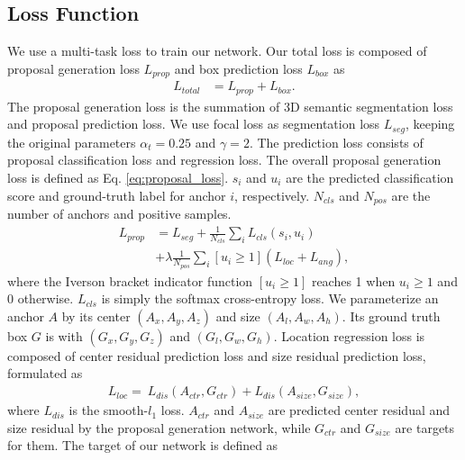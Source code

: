 \documentclass[10pt,twocolumn,letterpaper]{article}
\begin{document}
\subsection{Loss Function}
We use a multi-task loss to train our network. Our total loss is composed of proposal generation loss $L_{prop}$ and box prediction loss $L_{box}$ as 
\begin{equation} \label{eq:total_loss}
\begin{aligned}
L_{total} &= L_{prop} + L_{box}.
\end{aligned}
\end{equation}
The proposal generation loss is the summation of 3D semantic segmentation loss and proposal prediction loss. We use focal loss \cite{FocalLoss} as segmentation loss $L_{seg}$, keeping the original parameters $\alpha_t = 0.25$ and $\gamma = 2$. The prediction loss consists of proposal classification loss and regression loss. The overall proposal generation loss is defined as Eq. \eqref{eq:proposal_loss}. $s_i$ and $u_i$ are the predicted classification score and ground-truth label for anchor $i$, respectively. $N_{cls}$ and $N_{pos}$ are the number of anchors and positive samples.
\begin{equation} \label{eq:proposal_loss}
\begin{aligned}
L_{prop} &= L_{seg} + \frac{1}{N_{cls}} \sum_i L_{cls} (s_i, u_i) \\
&+ \lambda \frac{1}{N_{pos}} \sum_i  [u_i \geq 1] (L_{loc} + L_{ang}),
\end{aligned}
\end{equation}
where the Iverson bracket indicator function $[u_i \geq 1]$ reaches 1 when $u_i \geq 1$ and 0 otherwise. $L_{cls}$ is simply the softmax cross-entropy loss.
We parameterize an anchor $A$ by its center $(A_x, A_y, A_z)$ and size $(A_l, A_w, A_h)$. Its ground truth box $G$ is with $(G_x, G_y, G_z)$ and $(G_l, G_w, G_h)$.
Location regression loss is composed of center residual prediction loss and size residual prediction loss, formulated as
\begin{equation} \label{eq:regnoangle}
\begin{aligned}
L_{loc} =\ L_{dis}(A_{ctr}, G_{ctr}) + L_{dis}(A_{size}, G_{size}),
\end{aligned}
\end{equation}
where $L_{dis}$ is the smooth-$l_1$ loss. $A_{ctr}$ and $A_{size}$ are predicted center residual and size residual by the proposal generation network, while $G_{ctr}$ and $G_{size}$ are targets for them. The target of our network is defined as
\end{document}
